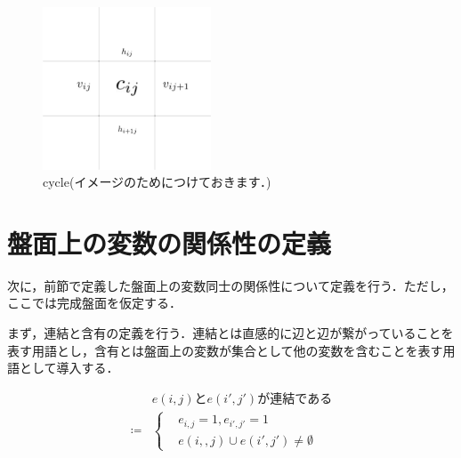 \begin{figure}[htbp]\label{fig:cycle}
  \centering
  \includegraphics[width=5cm]{fig/cycle.png}
  \caption{cycle(イメージのためにつけておきます．)}
\end{figure}


\section{盤面上の変数の関係性の定義}\label{section:RelationDefinition}

次に，前節で定義した盤面上の変数同士の関係性について定義を行う．ただし，ここでは完成盤面を仮定する．

まず，連結と含有の定義を行う．連結とは直感的に辺と辺が繋がっていることを表す用語とし，含有とは盤面上の変数が集合として他の変数を含むことを表す用語として導入する．

\begin{definition}\textup{}

  \begin{equation}
    \begin{aligned}
                & e(i,j)とe(i',j')が連結である \\
      \coloneqq &
      \left\{
      \begin{aligned}
         & e_{i,j}=1, e_{i',j'}=1             & \\
         & e(i,,j)\cup e(i',j')\neq \emptyset &
      \end{aligned}
      \right.
    \end{aligned}
  \end{equation}
\end{definition}

